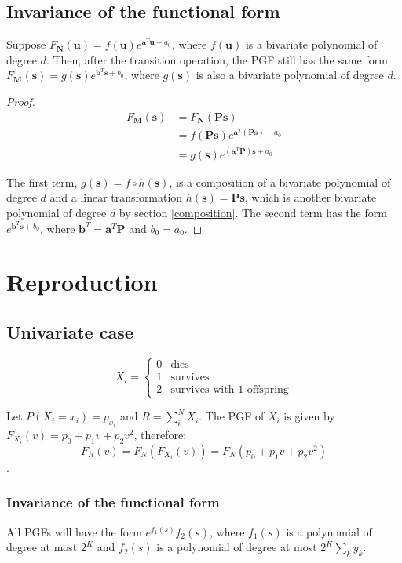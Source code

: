 \documentclass{article}
\begin{document}
\subsection{Invariance of the functional form}
Suppose $F_{\mathbf{N}}(\mathbf{u}) = f(\mathbf{u}) e^{\mathbf{a}^T \mathbf{u} + a_0}$, where $f(\mathbf{u})$ is a bivariate polynomial of degree $d$. Then, after the transition operation, the PGF still has the same form $F_{\mathbf{M}}(\mathbf{s}) = g(\mathbf{s}) e^{\mathbf{b}^T \mathbf{s} + b_0}$, where $g(\mathbf{s})$ is also a bivariate polynomial of degree $d$.

\begin{proof}
\begin{align*}
F_{\mathbf{M}}(\mathbf{s}) &=  F_{\mathbf{N}}(\mathbf{P} \mathbf{s}) \\
&= f(\mathbf{P} \mathbf{s}) e^{\mathbf{a}^T (\mathbf{\mathbf{P} \mathbf{s}}) + a_0} \\
&= g(\mathbf{s}) e^{(\mathbf{a}^T \mathbf{P}) \mathbf{s} + a_0}
\end{align*}

The first term, $g(\mathbf{s}) = f \circ h(\mathbf{s})$, is a composition of a bivariate polynomial of degree $d$ and a linear transformation $h(\mathbf{s}) = \mathbf{P} \mathbf{s}$, which is another bivariate polynomial of degree $d$ by section \ref{composition}. The second term has the form $e^{\mathbf{b}^T \mathbf{s} + b_0}$, where $\mathbf{b}^T = \mathbf{a}^T \mathbf{P}$ and $b_0 = a_0$.

\end{proof}

\section{Reproduction}
\subsection{Univariate case}
\[ X_i =
\begin{cases} 
    0 & \text{dies} \\
    1 & \text{survives} \\
    2 & \text{survives with 1 offspring}
\end{cases}
\]

Let $P(X_i = x_i) = p_{x_i}$ and $R = \sum_i^N X_i $. The PGF of $X_i$ is given by $F_{X_i}(v) = p_0 + p_1v + p_2v^2$, therefore:
$$F_R(v) = F_N(F_{X_i}(v)) = F_N(p_0 + p_1v + p_2v^2)$$.

\subsubsection{Invariance of the functional form}
All PGFs will have the form $e^{f_1(s)}f_2(s)$, where $f_1(s)$ is a polynomial of degree at most $2^K$ and $f_2(s)$ is a polynomial of degree at most $2^K \sum_k y_k$.
\end{document}
